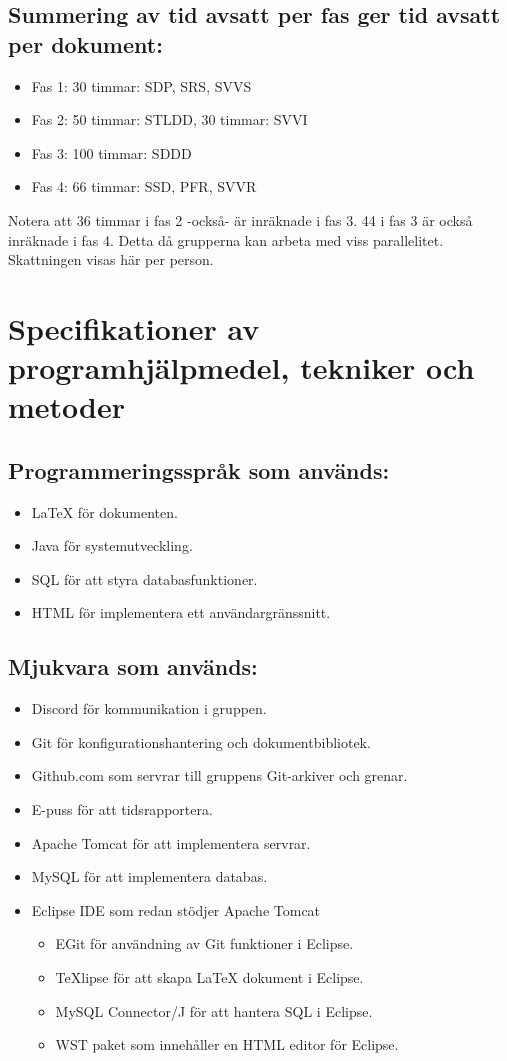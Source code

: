 \documentclass[paper=a4, fontsize=11pt,twoside]{article}
\begin{document}
\subsection*{Summering av tid avsatt per fas ger tid avsatt per dokument:}
\begin{itemize}
\item Fas 1: 30 timmar: SDP, SRS, SVVS
\item Fas 2: 50 timmar: STLDD, 30 timmar: SVVI
\item Fas 3: 100 timmar: SDDD
\item Fas 4: 66 timmar: SSD, PFR, SVVR
\end{itemize}
Notera att 36 timmar i fas 2 -också- är inräknade i fas 3. 44 i fas 3 är också inräknade i fas 4.
Detta då grupperna kan arbeta med viss parallelitet. Skattningen visas här per person.

\section{Specifikationer av programhjälpmedel, tekniker och metoder}

\subsection*{Programmeringsspråk som används:}
	\begin{itemize}
	\item LaTeX för dokumenten.
	\item Java för systemutveckling.
	\item SQL för att styra databasfunktioner.
	\item HTML för implementera ett användargränssnitt.
	\end{itemize}

\subsection*{Mjukvara som används:}
	\begin{itemize}
	\item Discord för kommunikation i gruppen.
	\item Git för konfigurationshantering och dokumentbibliotek.
	\item Github.com som servrar till gruppens Git-arkiver och grenar.
	\item E-puss för att tidsrapportera.
	\item Apache Tomcat för att implementera servrar.
	\item MySQL för att implementera databas.
	\item Eclipse IDE som redan stödjer Apache Tomcat
		\begin{itemize}
		\item EGit för användning av Git funktioner i Eclipse.
		\item TeXlipse för att skapa LaTeX dokument i Eclipse.
		\item MySQL Connector/J för att hantera SQL i Eclipse.
		\item WST paket som innehåller en HTML editor för Eclipse. 
		\end{itemize}
	\end{itemize}
\end{document}
